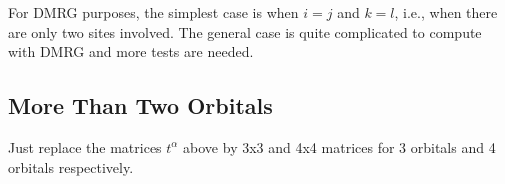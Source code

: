 \documentclass[twocolumn,showpacs,preprintnumbers,amsmath,amssymb,prb]{revtex4}
\begin{document}
For DMRG purposes, the simplest case is when $i=j$ and $k=l$, i.e., when there are only two sites involved.
The general case is quite complicated to compute with DMRG and more tests are needed.

\subsection{More Than Two Orbitals}
Just replace the matrices $t^\alpha$ above by 3x3 and 4x4 matrices for 3 orbitals and 4 orbitals respectively.
\end{document}
